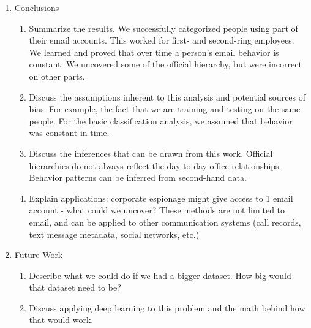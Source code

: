 \documentclass[12pt,dvips]{report}
\begin{document}
\begin{enumerate}
\begin{enumerate}
\end{enumerate}

\item Conclusions
\begin{enumerate}
\item Summarize the results.  We successfully categorized people using part of their email accounts.  This worked for first- and second-ring employees.  We learned and proved that over time a person's email behavior is constant.  We uncovered some of the official hierarchy, but were incorrect on other parts.
\item Discuss the assumptions inherent to this analysis and potential sources of bias.  For example, the fact that we are training and testing on the same people.  For the basic classification analysis, we assumed that behavior was constant in time.
\item Discuss the inferences that can be drawn from this work.  Official hierarchies do not always reflect the day-to-day office relationships.  Behavior patterns can be inferred from second-hand data.
\item Explain applications: corporate espionage might give access to 1 email account - what could we uncover?  These methods are not limited to email, and can be applied to other communication systems (call records, text message metadata, social networks, etc.)
\end{enumerate}

\item Future Work
\begin{enumerate}
\item Describe what we could do if we had a bigger dataset.  How big would that dataset need to be?
\item Discuss applying deep learning to this problem and the math behind how that would work.
\end{enumerate}

\end{enumerate}
\end{document}
